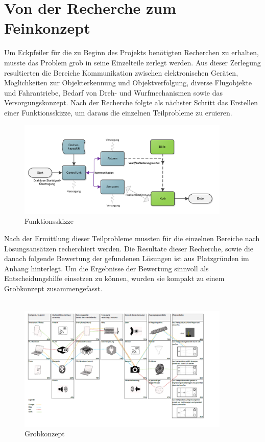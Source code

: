 \section{Von der Recherche zum Feinkonzept}
Um Eckpfeiler für die zu Beginn des Projekts benötigten Recherchen zu erhalten, musste das Problem grob in seine Einzelteile zerlegt werden. Aus dieser Zerlegung resultierten die Bereiche Kommunikation zwischen elektronischen Geräten, Möglichkeiten zur Objekterkennung und Objektverfolgung, diverse Flugobjekte und Fahrantriebe, Bedarf von Dreh- und Wurfmechanismen sowie das Versorgungskonzept. 
Nach der Recherche folgte als nächster Schritt das Erstellen einer Funktionsskizze, um daraus die einzelnen Teilprobleme zu eruieren.
\begin{figure}[h!]
	\centering
	\includegraphics[width=0.9\textwidth]{Enddokumentation/Varianten/Bilder/Funktionsskizze.png}
	\caption{Funktionsskizze}
	\label{fig:Funktionsskizze}
\end{figure}
Nach der Ermittlung dieser Teilprobleme mussten für die einzelnen Bereiche nach Lösungsansätzen recherchiert werden. Die Resultate dieser Recherche, sowie die danach folgende Bewertung der gefundenen Lösungen ist aus Platzgründen im Anhang hinterlegt. Um die Ergebnisse der Bewertung sinnvoll als Entscheidungshilfe einsetzen zu können, wurden sie kompakt zu einem Grobkonzept zusammengefasst.\\
\\
\begin{figure}
	\centering
	\includegraphics[width=0.9\textwidth]{Enddokumentation/Varianten/Bilder/Grobkonzept.png}
	\caption{Grobkonzept}
	\label{fig:Grobkonzept}
\end{figure}

